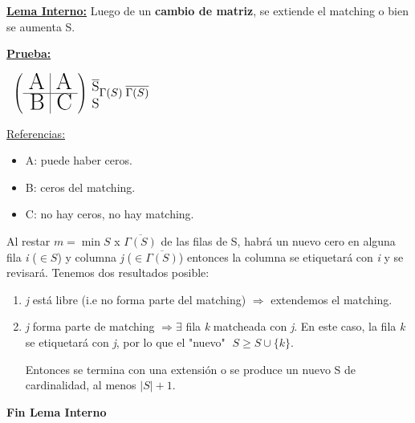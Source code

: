 \documentclass[12pt,a4paper]{report}
\begin{document}
\begin{enumerate}
					\underline{\textbf{Lema Interno:}} Luego de un \textbf{cambio de matriz}, se extiende el matching o bien se aumenta S.
						\par \underline{\textbf{Prueba:}}
						\begin{center}$
							\; \; \left(
							\begin{array}{r | r}
								\text{{\huge A}} & \text{{\huge A}} \\
								\hline
								\text{{\huge B}} & \text{{\huge C}}
							\end{array}
							\right)
							{\begin{subarray}{l} \; \overline{\text{{\large S}}} \\ \\ \; {\text{{\large S}}} \end{subarray}} \linebreak
							\Gamma(S) \; \overline{\Gamma(S)}
							$
						\end{center}

						\underline{Referencias:}
						\begin{itemize}
							\item A: puede haber ceros.
							\item B: ceros del matching.
							\item C: no hay ceros, no hay matching.
						\end{itemize}

						\par Al restar $\textit{m} = \min S$ x $\overline{\Gamma(S)}$ de las filas de S, habrá un nuevo cero en alguna fila \textit{i} ($\in S$) y columna \textit{j} ($\in \overline{\Gamma(S)}$) entonces la columna se etiquetará con \textit{i} y se revisará.
						Tenemos dos resultados posible:
						\begin{enumerate}
							\item \textit{j} está libre (i.e no forma parte del matching) $\Rightarrow$ extendemos el matching.
							\item \textit{j} forma parte de matching $\Rightarrow \exists$ fila \textit{k} matcheada con \textit{j}. En este caso, la fila \textit{k} se etiquetará con \textit{j}, por lo que el "nuevo" $\; S \geq S \cup \{\textit{k}\}$.

							\vspace{5mm}
							\par Entonces se termina con una extensión o se produce un nuevo S de cardinalidad, al menos $\lvert S \rvert + 1$.
						\end{enumerate}
					\textbf{Fin Lema Interno}


\end{enumerate}
\end{document}
